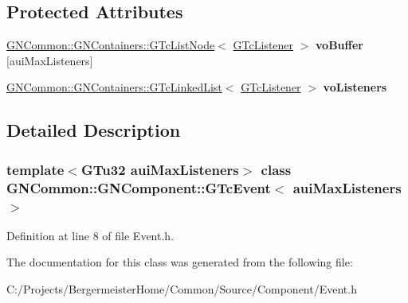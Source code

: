 \subsection*{Protected Attributes}
\begin{DoxyCompactItemize}
\item 
\mbox{\label{class_g_n_common_1_1_g_n_component_1_1_g_tc_event_a2c7fde6aa76e38ce816fbad446b2f3ea}} 
\mbox{\hyperlink{class_g_n_common_1_1_g_n_containers_1_1_g_tc_list_node}{G\+N\+Common\+::\+G\+N\+Containers\+::\+G\+Tc\+List\+Node}}$<$ \mbox{\hyperlink{class_g_n_common_1_1_g_n_component_1_1_g_tc_listener}{G\+Tc\+Listener}} $>$ {\bfseries vo\+Buffer} \mbox{[}aui\+Max\+Listeners\mbox{]}
\item 
\mbox{\label{class_g_n_common_1_1_g_n_component_1_1_g_tc_event_a1158c71b941779b471dd3905737e38f0}} 
\mbox{\hyperlink{class_g_n_common_1_1_g_n_containers_1_1_g_tc_linked_list}{G\+N\+Common\+::\+G\+N\+Containers\+::\+G\+Tc\+Linked\+List}}$<$ \mbox{\hyperlink{class_g_n_common_1_1_g_n_component_1_1_g_tc_listener}{G\+Tc\+Listener}} $>$ {\bfseries vo\+Listeners}
\end{DoxyCompactItemize}


\subsection{Detailed Description}
\subsubsection*{template$<$G\+Tu32 aui\+Max\+Listeners$>$\newline
class G\+N\+Common\+::\+G\+N\+Component\+::\+G\+Tc\+Event$<$ aui\+Max\+Listeners $>$}



Definition at line 8 of file Event.\+h.



The documentation for this class was generated from the following file\+:\begin{DoxyCompactItemize}
\item 
C\+:/\+Projects/\+Bergermeister\+Home/\+Common/\+Source/\+Component/Event.\+h\end{DoxyCompactItemize}
